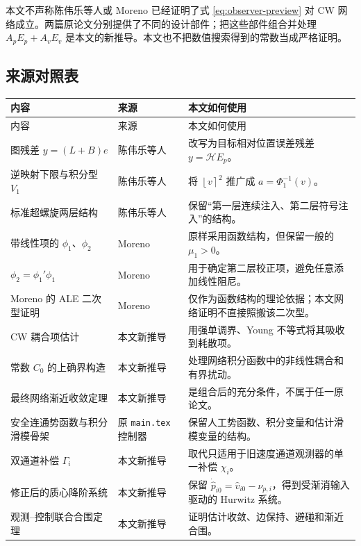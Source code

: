 \documentclass[UTF8,a4paper,12pt]{ctexart}
\newcommand{\ipow}[2]{\left\lfloor #1\right\rceil^{#2}}
\newcommand{\cH}{\mathcal H}
\begin{document}
\begin{auditbox}
本文不声称陈伟乐等人或 Moreno 已经证明了式 \eqref{eq:observer-preview} 对 CW 网络成立。两篇原论文分别提供了不同的设计部件；把这些部件组合并处理 $A_pE_p+A_vE_v$ 是本文的新推导。本文也不把数值搜索得到的常数当成严格证明。
\end{auditbox}

\subsection{来源对照表}

\begin{longtable}{p{}p{}p{}}
\toprule
内容 & 来源 & 本文如何使用 \\
\midrule
\endfirsthead
\toprule
内容 & 来源 & 本文如何使用 \\
\midrule
\endhead
图残差 $y=(L+B)e$ & 陈伟乐等人 \cite{Chen2024} & 改写为目标相对位置误差残差 $y=\cH E_p$。\\
逆映射下限与积分型 $V_1$ & 陈伟乐等人 \cite{Chen2024} & 将 $\ipow{v}{2}$ 推广成 $a=\Phi_1^{-1}(v)$。\\
标准超螺旋两层结构 & 陈伟乐等人 \cite{Chen2024} & 保留“第一层连续注入、第二层符号注入”的结构。\\
带线性项的 $\phi_1$、$\phi_2$ & Moreno \cite{Moreno2009} & 原样采用函数结构，但保留一般的 $\mu_1>0$。\\
$\phi_2=\phi_1'\phi_1$ & Moreno \cite{Moreno2009} & 用于确定第二层校正项，避免任意添加线性阻尼。\\
Moreno 的 ALE 二次型证明 & Moreno \cite{Moreno2009} & 仅作为函数结构的理论依据；本文网络证明不直接照搬该二次型。\\
CW 耦合项估计 & 本文新推导 & 用强单调界、Young 不等式将其吸收到耗散项。\\
常数 $C_0$ 的上确界构造 & 本文新推导 & 处理网络积分函数中的非线性耦合和有界扰动。\\
最终网络渐近收敛定理 & 本文新推导 & 是组合后的充分条件，不属于任一原论文。\\
安全连通势函数与积分滑模骨架 & 原 \texttt{main.tex} 控制器 & 保留人工势函数、积分变量和估计滑模变量的结构。\\
双通道补偿 $\Gamma_i$ & 本文新推导 & 取代只适用于旧速度通道观测器的单一补偿 $\chi_i$。\\
修正后的质心降阶系统 & 本文新推导 & 保留 $\dot{\hat p}_{i0}=\hat v_{i0}-\nu_{p,i}$，得到受渐消输入驱动的 Hurwitz 系统。\\
观测--控制联合合围定理 & 本文新推导 & 证明估计收敛、边保持、避碰和渐近合围。\\
\bottomrule
\end{longtable}
\end{document}
